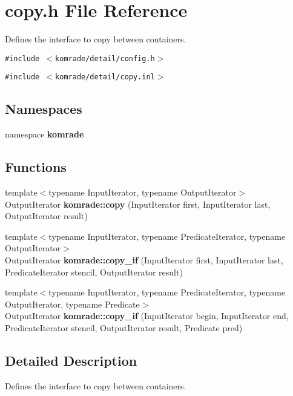 \section{copy.h File Reference}
\label{copy_8h}
Defines the interface to copy between containers. 

{\tt \#include $<$komrade/detail/config.h$>$}\par
{\tt \#include $<$komrade/detail/copy.inl$>$}\par
\subsection*{Namespaces}
\begin{CompactItemize}
\item 
namespace {\bf komrade}
\end{CompactItemize}
\subsection*{Functions}
\begin{CompactItemize}
\item 
{\footnotesize template$<$typename InputIterator, typename OutputIterator$>$ }\\OutputIterator {\bf komrade::copy} (InputIterator first, InputIterator last, OutputIterator result)
\item 
{\footnotesize template$<$typename InputIterator, typename PredicateIterator, typename OutputIterator$>$ }\\OutputIterator {\bf komrade::copy\_\-if} (InputIterator first, InputIterator last, PredicateIterator stencil, OutputIterator result)
\item 
{\footnotesize template$<$typename InputIterator, typename PredicateIterator, typename OutputIterator, typename Predicate$>$ }\\OutputIterator {\bf komrade::copy\_\-if} (InputIterator begin, InputIterator end, PredicateIterator stencil, OutputIterator result, Predicate pred)
\end{CompactItemize}


\subsection{Detailed Description}
Defines the interface to copy between containers. 

